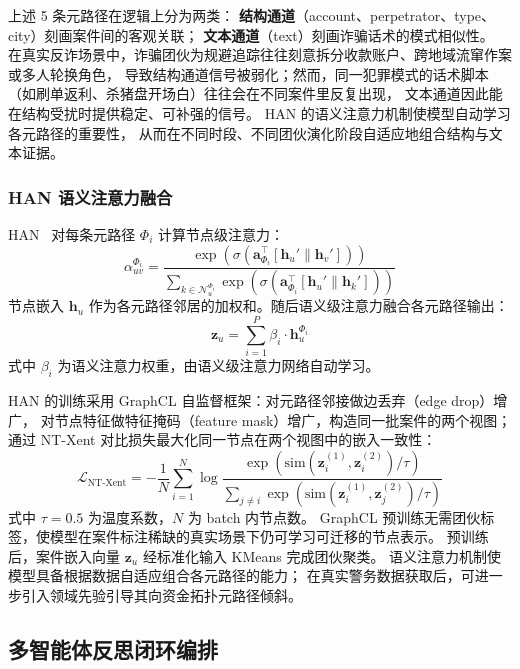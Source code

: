 \documentclass[12pt,a4paper]{ctexart}
\begin{document}
上述 5 条元路径在逻辑上分为两类：
\textbf{结构通道}（account、perpetrator、type、city）刻画案件间的客观关联；
\textbf{文本通道}（text）刻画诈骗话术的模式相似性。
在真实反诈场景中，诈骗团伙为规避追踪往往刻意拆分收款账户、跨地域流窜作案或多人轮换角色，
导致结构通道信号被弱化；然而，同一犯罪模式的话术脚本（如刷单返利、杀猪盘开场白）往往会在不同案件里反复出现，
文本通道因此能在结构受扰时提供稳定、可补强的信号。
HAN 的语义注意力机制\cite{wang2019han}使模型自动学习各元路径的重要性，
从而在不同时段、不同团伙演化阶段自适应地组合结构与文本证据。

\subsubsection{HAN 语义注意力融合}

HAN~\cite{wang2019han,wu2023moneylaunder,liu2025creditcardhan} 对每条元路径 $\Phi_i$ 计算节点级注意力：
\begin{equation}
\alpha_{uv}^{\Phi_i} = \frac{\exp(\sigma(\mathbf{a}_{\Phi_i}^\top [\mathbf{h}_u' \| \mathbf{h}_v']))}
{\sum_{k \in \mathcal{N}_u^{\Phi_i}} \exp(\sigma(\mathbf{a}_{\Phi_i}^\top [\mathbf{h}_u' \| \mathbf{h}_k']))}
\end{equation}
节点嵌入 $\mathbf{h}_u$ 作为各元路径邻居的加权和。随后语义级注意力融合各元路径输出：
\begin{equation}
\mathbf{z}_u = \sum_{i=1}^{P} \beta_i \cdot \mathbf{h}_u^{\Phi_i}
\end{equation}
式中 $\beta_i$ 为语义注意力权重，由语义级注意力网络自动学习。

HAN 的训练采用 GraphCL 自监督框架：对元路径邻接做边丢弃（edge drop）增广，
对节点特征做特征掩码（feature mask）增广，构造同一批案件的两个视图；
通过 NT-Xent 对比损失最大化同一节点在两个视图中的嵌入一致性：
\begin{equation}
\mathcal{L}_{\text{NT-Xent}} = -\frac{1}{N}\sum_{i=1}^{N} \log \frac{
  \exp(\text{sim}(\mathbf{z}_i^{(1)}, \mathbf{z}_i^{(2)}) / \tau)
}{\sum_{j \neq i} \exp(\text{sim}(\mathbf{z}_i^{(1)}, \mathbf{z}_j^{(2)}) / \tau)}
\end{equation}
式中 $\tau=0.5$ 为温度系数，$N$ 为 batch 内节点数。
GraphCL 预训练无需团伙标签，使模型在案件标注稀缺的真实场景下仍可学习可迁移的节点表示。
预训练后，案件嵌入向量 $\mathbf{z}_u$ 经标准化输入 KMeans 完成团伙聚类。
语义注意力机制使模型具备根据数据自适应组合各元路径的能力；
在真实警务数据获取后，可进一步引入领域先验引导其向资金拓扑元路径倾斜。

\subsection{多智能体反思闭环编排}
\label{sec:reflection}
\end{document}

